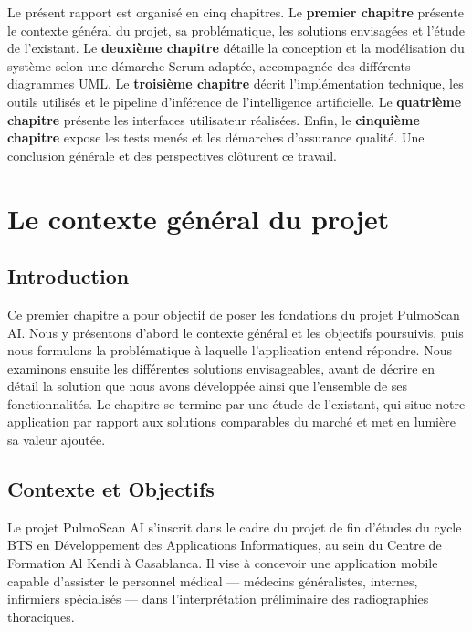 \documentclass[12pt,a4paper]{report}
\begin{document}
\bigskip
Le présent rapport est organisé en cinq chapitres. Le \textbf{premier chapitre} présente le contexte général du projet, sa problématique, les solutions envisagées et l'étude de l'existant. Le \textbf{deuxième chapitre} détaille la conception et la modélisation du système selon une démarche Scrum adaptée, accompagnée des différents diagrammes UML. Le \textbf{troisième chapitre} décrit l'implémentation technique, les outils utilisés et le pipeline d'inférence de l'intelligence artificielle. Le \textbf{quatrième chapitre} présente les interfaces utilisateur réalisées. Enfin, le \textbf{cinquième chapitre} expose les tests menés et les démarches d'assurance qualité. Une conclusion générale et des perspectives clôturent ce travail.

\chapter{Le contexte général du projet}

\section*{Introduction}
Ce premier chapitre a pour objectif de poser les fondations du projet PulmoScan AI. Nous y présentons d'abord le contexte général et les objectifs poursuivis, puis nous formulons la problématique à laquelle l'application entend répondre. Nous examinons ensuite les différentes solutions envisageables, avant de décrire en détail la solution que nous avons développée ainsi que l'ensemble de ses fonctionnalités. Le chapitre se termine par une étude de l'existant, qui situe notre application par rapport aux solutions comparables du marché et met en lumière sa valeur ajoutée.

\section{Contexte et Objectifs}
Le projet PulmoScan AI s'inscrit dans le cadre du projet de fin d'études du cycle BTS en Développement des Applications Informatiques, au sein du Centre de Formation Al Kendi à Casablanca. Il vise à concevoir une application mobile capable d'assister le personnel médical --- médecins généralistes, internes, infirmiers spécialisés --- dans l'interprétation préliminaire des radiographies thoraciques.
\end{document}
